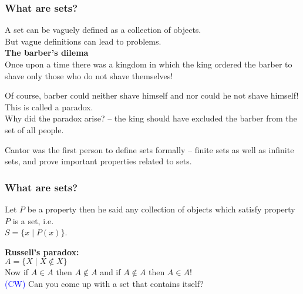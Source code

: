  \begin{frame}[fragile]
\frametitle{What are sets?}
A set can be vaguely defined as a collection of objects.\\

But vague definitions can lead to problems.\\


{\bf The barber's dilema}\\

Once upon a time there was a kingdom in which the king ordered the barber to shave only those who 
do not shave themselves! 


Of course, barber could neither shave himself and nor could he not shave himself!\\

This is called a paradox.\\

Why did the paradox arise? 
 -- the king should have excluded the barber from the set of all people.


Cantor was the first person to define sets formally -- finite sets as well as infinite sets, and prove important properties related to sets.\\



\end{frame}

 \begin{frame}[fragile]
\frametitle{What are sets?}

Let $P$ be a property then he said any collection of objects which satisfy property $P$ is a set, i.e.\\
$S = \{x \mid P(x)\}$.

{\bf Russell's paradox:}\\
$A = \{X \mid X \notin X\}$\\

Now if $A \in A$ then $A \notin A$ and if $A \notin A$ then $A \in A$!\\

\textcolor{blue}{(CW)} Can you come up with a set that contains itself?\\




\end{frame}


